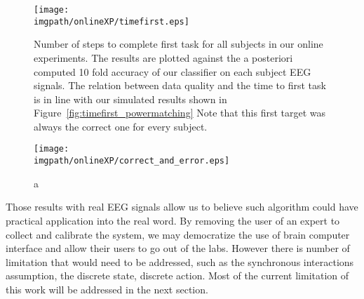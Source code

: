 \begin{figure}[!ht]
\centering
\texttt{[image: \\imgpath/onlineXP/timefirst.eps]}
\caption{Number of steps to complete first task for all subjects in our online experiments. The results are plotted against the a posteriori computed 10 fold accuracy of our classifier on each subject EEG signals. The relation between data quality and the time to first task is in line with our simulated results shown in Figure~\ref{fig:timefirst_powermatching} Note that this first target was always the correct one for every subject.}
\label{fig:timefirst_online}
\end{figure} 


\begin{figure}[!ht]
\centering
\texttt{[image: \\imgpath/onlineXP/correct\_and\_error.eps]}
\caption{a}
\label{fig:correcterror_online}
\end{figure} 


\transition


Those results with real EEG signals allow us to believe such algorithm could have practical application into the real word. By removing the user of an expert to collect and calibrate the system, we may democratize the use of brain computer interface and allow their users to go out of the labs. However there is number of limitation that would need to be addressed, such as the synchronous interactions assumption, the discrete state, discrete action. Most of the current limitation of this work will be addressed in the next section.

